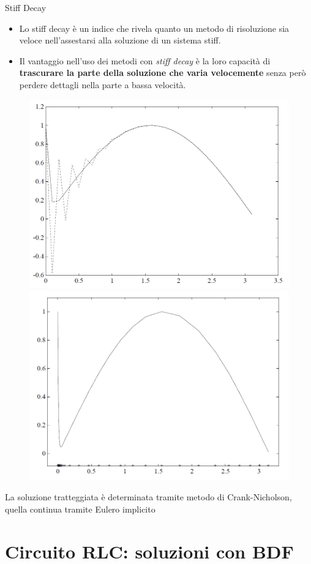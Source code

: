 \documentclass[aspectratio=169, 10pt, handout,usenames,dvipsnames]{beamer}
\begin{document}
    \begin{frame}{Stiff Decay}
        \medskip
        \medskip
        \begin{itemize}
        \item Lo stiff decay è un \alert{indice} che rivela quanto un metodo di risoluzione sia veloce nell’assestarsi alla soluzione di un sistema stiff.\\
        \item Il vantaggio nell'uso dei metodi con \textit{stiff decay} è la loro capacità di \textbf{trascurare la parte della soluzione che
        varia velocemente} senza però perdere dettagli nella parte a bassa velocità.
        \end{itemize}
        \begin{figure}
        \includegraphics[width=.4\linewidth]{fig8.png}
        \includegraphics[width=.4\linewidth]{fig9.png}
        \label{fig:stiff_decay}
    \end{figure}
        \begin{centering}
        La soluzione tratteggiata è determinata tramite metodo di Crank-Nicholson, quella continua tramite Eulero implicito
        \end{centering}
    \end{frame}

\section{Circuito RLC: soluzioni con BDF}\label{sec:sec12}  
\end{document}
